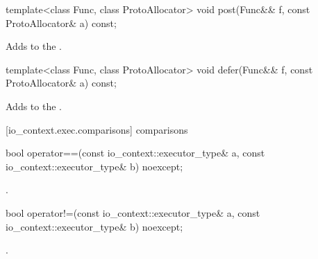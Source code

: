 %
\begin{itemdecl}
template<class Func, class ProtoAllocator>
  void post(Func&& f, const ProtoAllocator& a) const;
\end{itemdecl}

\begin{itemdescr}
\pnum
\effects Adds  to the .
\end{itemdescr}

%
\begin{itemdecl}
template<class Func, class ProtoAllocator>
  void defer(Func&& f, const ProtoAllocator& a) const;
\end{itemdecl}

\begin{itemdescr}
\pnum
\effects Adds  to the .
\end{itemdescr}



[io_context.exec.comparisons]{ comparisons}

%
\begin{itemdecl}
bool operator==(const io_context::executor_type& a,
                const io_context::executor_type& b) noexcept;
\end{itemdecl}

\begin{itemdescr}
\pnum
\returns {}.
\end{itemdescr}

%
\begin{itemdecl}
bool operator!=(const io_context::executor_type& a,
                const io_context::executor_type& b) noexcept;
\end{itemdecl}

\begin{itemdescr}
\pnum
\returns {}.
\end{itemdescr}




